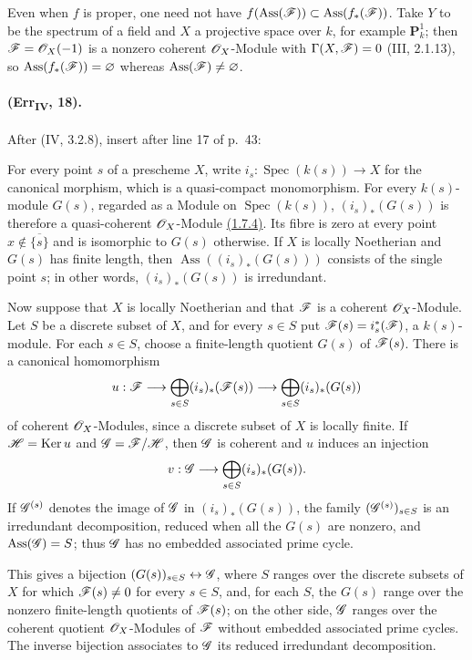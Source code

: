 \begin{remark}[3.1.10.5]
\label{IV.3.1.10.5}
Even when $f$ is proper, one need not have
$f(\operatorname{Ass}(\mathscr{F}))\subset
\operatorname{Ass}(f_*(\mathscr{F}))$.  Take $Y$ to be the spectrum of a
field and $X$ a projective space over $k$, for example $\mathbf P^1_k$;
then $\mathscr{F}=\mathscr{O}_X(-1)$ is a nonzero coherent $\mathscr{O}_X$-Module with
$\Gamma(X,\mathscr{F})=0$ (III, 2.1.13), so
$\operatorname{Ass}(f_*(\mathscr{F}))=\varnothing$ whereas
$\operatorname{Ass}(\mathscr{F})\neq\varnothing$.
\end{remark}

\paragraph{(Err\textsubscript{IV}, 18).}
After (IV, 3.2.8), insert after line 17 of p.~43:

\begin{remark}[3.2.9]
\label{IV.3.2.9}
For every point $s$ of a prescheme $X$, write
$i_s:\operatorname{Spec}(k(s))\to X$ for the canonical morphism, which
is a quasi-compact monomorphism.  For every $k(s)$-module $G(s)$,
regarded as a Module on $\operatorname{Spec}(k(s))$,
$(i_s)_*(G(s))$ is therefore a quasi-coherent $\mathscr{O}_X$-Module
{\hyperref[subsection:IV.1.7]{(1.7.4)}}.  Its fibre is zero at every point
$x\notin\overline{\{s\}}$ and is isomorphic to $G(s)$ otherwise.  If
$X$ is locally Noetherian and $G(s)$ has finite length, then
$\operatorname{Ass}((i_s)_*(G(s)))$ consists of the single point $s$;
in other words, $(i_s)_*(G(s))$ is irredundant.

Now suppose that $X$ is locally Noetherian and that $\mathscr{F}$ is a
coherent $\mathscr{O}_X$-Module.  Let $S$ be a discrete subset of $X$, and
for every $s\in S$ put $\mathscr{F}(s)=i_s^*(\mathscr{F})$, a $k(s)$-module.
For each $s\in S$, choose a finite-length quotient $G(s)$ of
$\mathscr{F}(s)$.  There is a canonical homomorphism
\[
 u:\mathscr{F}\longrightarrow
 \bigoplus_{s\in S}(i_s)_*(\mathscr{F}(s))\longrightarrow
 \bigoplus_{s\in S}(i_s)_*(G(s))
\]
of coherent $\mathscr{O}_X$-Modules, since a discrete subset of $X$ is
locally finite.  If $\mathscr{H}=\operatorname{Ker}u$ and
$\mathscr{G}=\mathscr{F}/\mathscr{H}$, then $\mathscr{G}$ is coherent and $u$ induces an
injection
\[
 v:\mathscr{G}\longrightarrow\bigoplus_{s\in S}(i_s)_*(G(s)).
\]
If $\mathscr{G}^{(s)}$ denotes the image of $\mathscr{G}$ in
$(i_s)_*(G(s))$, the family $(\mathscr{G}^{(s)})_{s\in S}$ is an
irredundant decomposition, reduced when all the $G(s)$ are nonzero, and
$\operatorname{Ass}(\mathscr{G})=S$; thus $\mathscr{G}$ has no embedded
associated prime cycle.

This gives a bijection $(G(s))_{s\in S}\leftrightarrow\mathscr{G}$, where
$S$ ranges over the discrete subsets of $X$ for which
$\mathscr{F}(s)\neq0$ for every $s\in S$, and, for each $S$, the $G(s)$
range over the nonzero finite-length quotients of $\mathscr{F}(s)$; on the
other side, $\mathscr{G}$ ranges over the coherent quotient
$\mathscr{O}_X$-Modules of $\mathscr{F}$ without embedded associated prime
cycles.  The inverse bijection associates to $\mathscr{G}$ its reduced
irredundant decomposition.
\end{remark}

